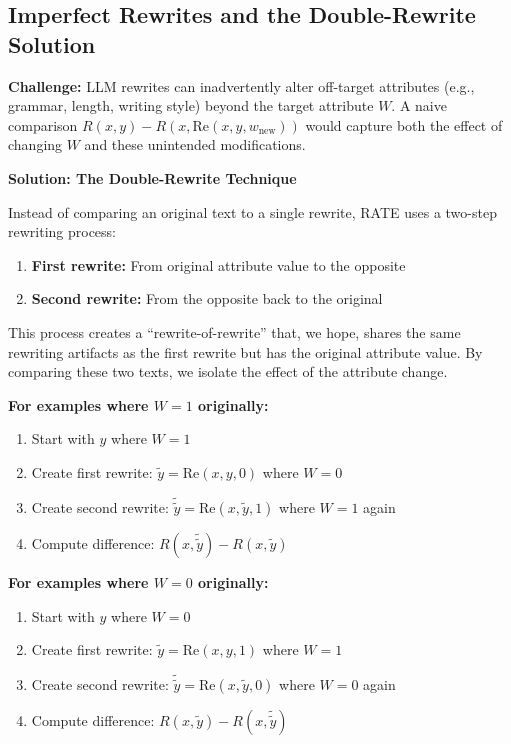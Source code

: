 \subsection{Imperfect Rewrites and the Double-Rewrite Solution}

\textbf{Challenge:} LLM rewrites can inadvertently alter off-target attributes (e.g., grammar, length, writing style) beyond the target attribute $W$. A naive comparison $R(x, y) - R(x, \text{Re}(x,y,w_{\text{new}}))$ would capture both the effect of changing $W$ and these unintended modifications.

\noindent\textbf{Solution: The Double-Rewrite Technique}

Instead of comparing an original text to a single rewrite, RATE uses a two-step rewriting process:
\begin{enumerate}
    \item \textbf{First rewrite:} From original attribute value to the opposite
    \item \textbf{Second rewrite:} From the opposite back to the original
\end{enumerate}

This process creates a ``rewrite-of-rewrite'' that, we hope, shares the same rewriting artifacts as the first rewrite but has the original attribute value. By comparing these two texts, we isolate the effect of the attribute change.

\textbf{For examples where $W=1$ originally:}
\begin{enumerate}
    \item Start with $y$ where $W=1$
    \item Create first rewrite: $\tilde{y} = \text{Re}(x,y,0)$ where $W=0$
    \item Create second rewrite: $\tilde{\tilde{y}} = \text{Re}(x,\tilde{y},1)$ where $W=1$ again
    \item Compute difference: $R(x, \tilde{\tilde{y}}) - R(x, \tilde{y})$
\end{enumerate}

\textbf{For examples where $W=0$ originally:}
\begin{enumerate}
    \item Start with $y$ where $W=0$
    \item Create first rewrite: $\tilde{y} = \text{Re}(x,y,1)$ where $W=1$
    \item Create second rewrite: $\tilde{\tilde{y}} = \text{Re}(x,\tilde{y},0)$ where $W=0$ again
    \item Compute difference: $R(x, \tilde{y}) - R(x, \tilde{\tilde{y}})$
\end{enumerate}

